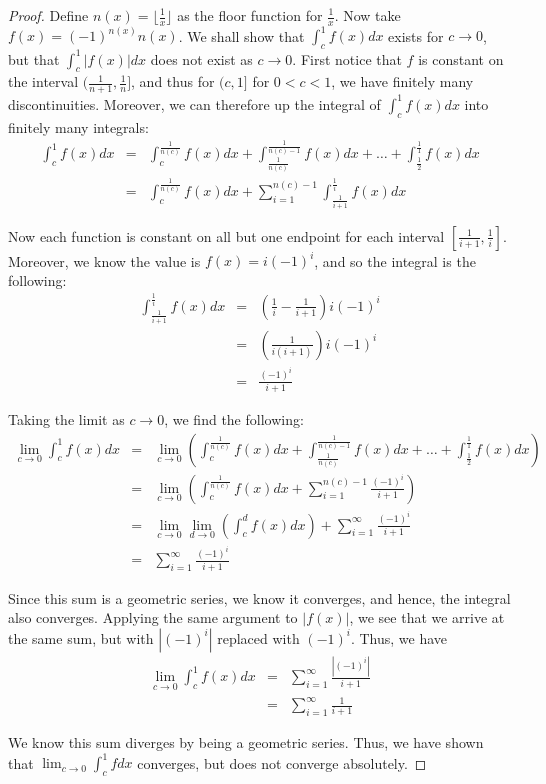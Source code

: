 \documentclass[psamsfonts]{amsart}
\theoremstyle{definition}
\theoremstyle{remark}
\numberwithin{equation}{section}
\begin{document}
\begin{proof}
Define $n(x)=\lfloor{\frac{1}{x}}\rfloor$ as the floor function for $\frac{1}{x}$. Now take $f(x) = (-1)^{n(x)} n(x)$. We shall show that $\int_c^1 f(x) dx$ exists for $c \to 0$, but that $\int_c^1 |f(x)| dx$ does not exist as $c \to 0$. First notice that $f$ is constant on the interval $(\frac{1}{n+1}, \frac{1}{n}]$, and thus for $(c,1]$ for $0 < c < 1$, we have finitely many discontinuities. Moreover, we can therefore up the integral of $\int_c^1 f(x) dx$ into finitely many integrals:
\begin{eqnarray}
\int_c^1 f(x) dx &=& \int_{c}^{\frac{1}{n(c)}} f(x) dx + \int_{\frac{1}{n(c)}}^{\frac{1}{n(c)-1}} f(x) dx + \ldots + \int_{\frac{1}{2}}^{\frac{1}{1}} f(x) dx \\
&=&\int_{c}^{\frac{1}{n(c)}} f(x) dx + \sum_{i=1}^{n(c)-1} \int_{\frac{1}{i+1}}^{\frac{1}{i}} f(x) dx
\end{eqnarray}

Now each function is constant on all but one endpoint for each interval $[\frac{1}{i+1}, \frac{1}{i} ]$. Moreover, we know the value is $f(x) = i (-1)^i$, and so the integral is the following:
\begin{eqnarray}
\int_{\frac{1}{i+1}}^{\frac{1}{i}} f(x) dx &=& \left( \frac{1}{i} - \frac{1}{i+1} \right) i (-1)^i \\
&=& \left(\frac{1}{i(i+1)} \right) i (-1)^i \\
&=& \frac{(-1)^i}{i+1}
\end{eqnarray}

Taking the limit as $c \to 0$, we find the following:
\begin{eqnarray}
\lim_{c \to 0} \int_c^1 f(x) dx &=& \lim_{c \to 0}  \left( \int_{c}^{\frac{1}{n(c)}} f(x) dx + \int_{\frac{1}{n(c)}}^{\frac{1}{n(c)-1}} f(x) dx + \ldots + \int_{\frac{1}{2}}^{\frac{1}{1}} f(x) dx \right)\\
&=& \lim_{c \to 0} \left(  \int_{c}^{\frac{1}{n(c)}} f(x) dx + \sum_{i=1}^{n(c)-1} \frac{(-1)^i}{i+1} \right)\\
&=& \lim_{c \to 0} \lim_{d \to 0}\left(  \int_c^d f(x) dx \right) + \sum_{i=1}^\infty \frac{(-1)^i}{i+1} \\
&=& \sum_{i=1}^\infty \frac{(-1)^i}{i+1} 
\end{eqnarray}

Since this sum is a geometric series, we know it converges, and hence, the integral also converges. Applying the same argument to $|f(x)|$, we see that we arrive at the same sum, but with $|(-1)^i|$ replaced with $(-1)^i$. Thus, we have
\begin{eqnarray}
\lim_{c \to 0} \int_c^1 f(x) dx &=& \sum_{i=1}^\infty \frac{|(-1)^i|}{i+1} \\
&=& \sum_{i=1}^\infty \frac{1}{i+1} 
\end{eqnarray}

We know this sum diverges by being a geometric series. Thus, we have shown that $\lim_{c \to 0} \int_c^1 f dx$ converges, but does not converge absolutely. 
\end{proof}
\end{document}
